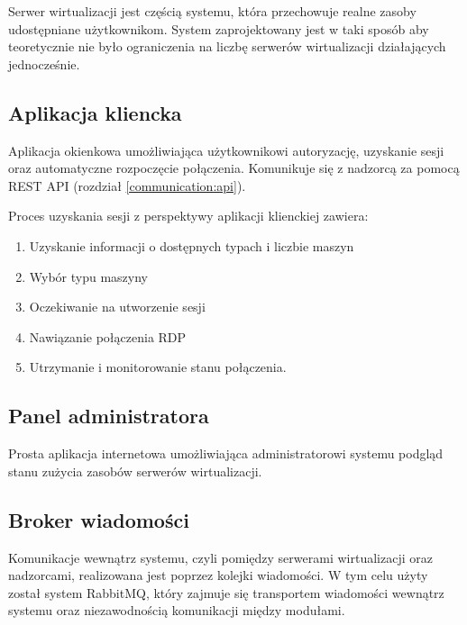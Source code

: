 \documentclass[../opis-rozwiazania.tex]{subfiles}
\begin{document}
Serwer wirtualizacji jest częścią systemu, która przechowuje realne zasoby udostępniane użytkownikom.
System zaprojektowany jest w taki sposób aby teoretycznie nie było ograniczenia na liczbę serwerów wirtualizacji działających jednocześnie.

\subsection{Aplikacja kliencka}
\label{modules:client}

Aplikacja okienkowa umożliwiająca użytkownikowi autoryzację, uzyskanie sesji oraz automatyczne rozpoczęcie połączenia. Komunikuje się z nadzorcą za pomocą REST API (rozdział \ref{communication:api}).

Proces uzyskania sesji z perspektywy aplikacji klienckiej zawiera:
\begin{enumerate}
      \item Uzyskanie informacji o dostępnych typach i liczbie maszyn
      \item Wybór typu maszyny
      \item Oczekiwanie na utworzenie sesji
      \item Nawiązanie połączenia RDP
      \item Utrzymanie i monitorowanie stanu połączenia.
\end{enumerate}

\subsection{Panel administratora}

Prosta aplikacja internetowa umożliwiająca administratorowi systemu podgląd stanu zużycia zasobów serwerów wirtualizacji.

\subsection{Broker wiadomości}
\label{modules:broker}

Komunikacje wewnątrz systemu, czyli pomiędzy serwerami wirtualizacji oraz nadzorcami, realizowana jest  poprzez kolejki wiadomości. W tym celu użyty został system RabbitMQ, który zajmuje się transportem wiadomości wewnątrz systemu oraz niezawodnością komunikacji między modułami.
\end{document}
